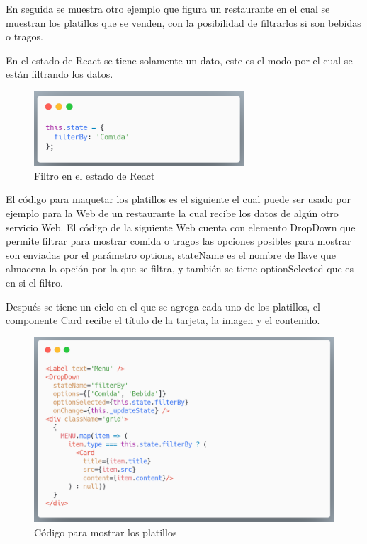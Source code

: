 En seguida se muestra otro ejemplo que figura un restaurante en el cual se muestran los platillos que se venden, con la posibilidad de filtrarlos si son bebidas o tragos.

En el estado de React se tiene solamente un dato, este es el modo por el cual se están filtrando los datos.
\newline
\begin{figure}[H]
    \includegraphics[width=0.7\textwidth]{./Imagenes/9.11-2}
   \centering 
    \caption[Filtro en el estado de React]{Filtro en el estado de React}
    \end{figure}
\newline

El código para maquetar los platillos es el siguiente el cual puede ser usado por ejemplo para la Web de un restaurante la cual recibe los datos de algún otro servicio Web.
El código de la siguiente Web cuenta con elemento DropDown que permite filtrar para mostrar comida o tragos las opciones posibles para mostrar son enviadas por el parámetro options, stateName es el nombre de llave que almacena la opción por la que se filtra, y también se tiene optionSelected que es en si el filtro.

Después se tiene un ciclo en el que se agrega cada uno de los platillos, el componente Card recibe el título de la tarjeta, la imagen y el contenido.
\newline
\begin{figure}[H]
    \includegraphics[width=1\textwidth]{./Imagenes/9.12.png}
   \centering 
    \caption[Código para mostrar los platillos]{Código para mostrar los platillos}
    \end{figure}
\newline

